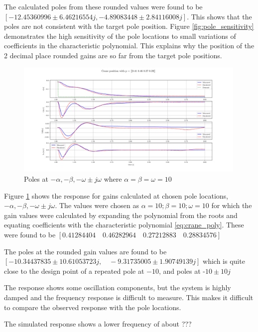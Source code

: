\documentclass{article}
\begin{document}
The calculated poles from these rounded values were found to be $[-12.45360996 \pm 6.46216554j, -4.89083448 \pm 2.84116008j]$.
This shows that the poles are not consistent with the target pole position.
Figure \ref{fig:pole_sensitivity} demonstrates the high sensitivity of the pole locations to small variations of coefficients in the characteristic polynomial.
This explains why the position of the 2 decimal place rounded gains are so far from the target pole positions.

\begin{figure}[H]
  \centering
  \includegraphics[width=0.99\textwidth]{figures/3.4b.png}
  \caption{Poles at $-\alpha, -\beta, -\omega \pm j\omega$ where $\alpha = \beta = \omega = 10$}
  \label{fig:exp3.4b}
\end{figure}

Figure \ref{fig:exp3.4b} shows the response for gains calculated at chosen pole locations, $-\alpha, -\beta, -\omega \pm j\omega$.
The values were chosen as $\alpha = 10; \beta= 10; \omega = 10$ for which the gain values were calculated by expanding the polynomial from the roots and equating
coefficients with the characteristic polynomial \ref{eq:crane_poly}.
These were found to be $[0.41284404 \quad 0.46282964 \quad 0.27212883 \quad 0.28834576]$

The poles at the rounded gain values are found to be $[-10.34437835 \pm 10.61053723j, \quad -9.31735005 \pm 1.90749139j]$ 
which is quite close to the design point of a repeated pole at $-10$, and poles at -$10\pm 10j$

The response shows some oscillation components, but the system is highly damped and the frequency response is difficult to measure.
This makes it difficult to compare the observed response with the pole locations.

The simulated response shows a lower frequency of about ???
\end{document}
